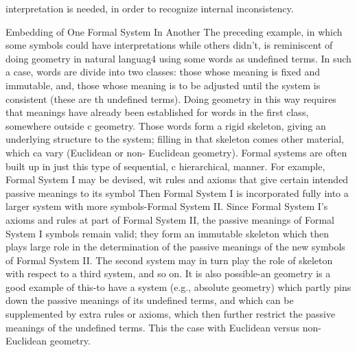 interpretation is needed, in order to recognize internal inconsistency. 







Embedding of One Formal System In Another The preceding example, in which some symbols could have interpretations while others didn't, is reminiscent of doing geometry in natural languag4 using some words as undefined terms. In such a case, words are divide into two classes: those whose meaning is fixed and immutable, and, those whose meaning is to be adjusted until the system is consistent (these are th undefined terms). Doing geometry in this way requires that meanings have already been established for words in the first class, somewhere outside c geometry. Those words form a rigid skeleton, giving an underlying structure to the system; filling in that skeleton comes other material, which ca vary (Euclidean or non- Euclidean geometry). Formal systems are often built up in just this type of sequential, c hierarchical, manner. For example, Formal System I may be devised, wit rules and axioms that give certain intended passive meanings to its symbol Then Formal System I is incorporated fully into a larger system with more symbols-Formal System II. Since Formal System I's axioms and rules at part of Formal System II, the passive meanings of Formal System I symbols remain valid; they form an immutable skeleton which then plays large role in the determination of the passive meanings of the new symbols of Formal System II. The second system may in turn play the role of skeleton with respect to a third system, and so on. It is also possible-an geometry is a good example of this-to have a system (e.g., absolute geometry) which partly pins down the passive meanings of its undefined terms, and which can be supplemented by extra rules or axioms, which then further restrict the passive meanings of the undefined terms. This the case with Euclidean versus non- Euclidean geometry. 

